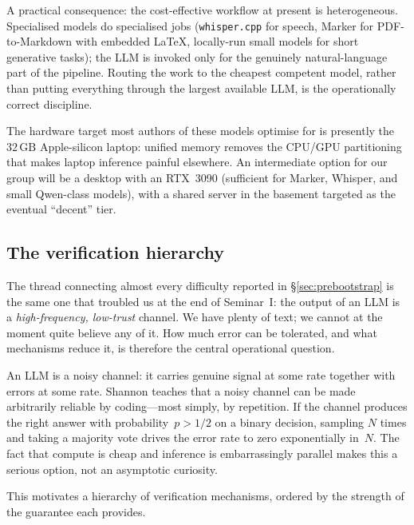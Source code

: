 A practical consequence: the cost-effective workflow at
present is heterogeneous.  Specialised models do specialised
jobs (\texttt{whisper.cpp} for speech, Marker for
PDF-to-Markdown with embedded \LaTeX, locally-run small models
for short generative tasks); the LLM is invoked only for the
genuinely natural-language part of the pipeline.  Routing the
work to the cheapest competent model, rather than putting
everything through the largest available LLM, is the
operationally correct discipline.

\begin{remark}[On hardware]
  The hardware target most authors of these models optimise
  for is presently the $32\,\text{GB}$ Apple-silicon laptop:
  unified memory removes the CPU/GPU partitioning that makes
  laptop inference painful elsewhere.  An intermediate option
  for our group will be a desktop with an RTX~3090 (sufficient
  for Marker, Whisper, and small Qwen-class models), with a
  shared server in the basement targeted as the eventual
  ``decent'' tier.
\end{remark}

\subsection{The verification hierarchy}\label{sec:verification-hierarchy}

The thread connecting almost every difficulty reported in
\S\ref{sec:prebootstrap} is the same one that troubled us at
the end of Seminar~I: the output of an LLM is a
\emph{high-frequency, low-trust} channel.  We have plenty of
text; we cannot at the moment quite believe any of it.  How
much error can be tolerated, and what mechanisms reduce it,
is therefore the central operational question.

\begin{intuition}
  An LLM is a noisy channel: it carries genuine signal at
  some rate together with errors at some rate.  Shannon
  teaches that a noisy channel can be made arbitrarily
  reliable by coding---most simply, by repetition.  If the
  channel produces the right answer with probability~$p > 1/2$
  on a binary decision, sampling $N$ times and taking a
  majority vote drives the error rate to zero exponentially
  in~$N$.  The fact that compute is cheap and inference is
  embarrassingly parallel makes this a serious option, not
  an asymptotic curiosity.
\end{intuition}

This motivates a hierarchy of verification mechanisms,
ordered by the strength of the guarantee each provides.

